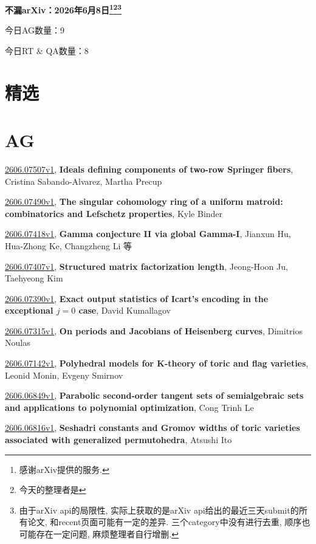 \documentclass[9pt, a4paper]{article}
\theoremstyle{plain}
\theoremstyle{definition}
\theoremstyle{remark}
\newcommand{\arxiv}[3]{\href{https://arxiv.org/abs/#1}{#1}, \textbf{\textcolor{arxivblue}{#2}}, #3}
\newcommand{\AGnumber}{9}
\newcommand{\RTQAnumber}{8}
\newcommand{\NewestDate}{2026年6月8日}
\newcommand{\todayarXiver}{} %
\begin{document}
\begin{center}
    \Huge\textbf{不漏arXiv：\NewestDate\footnote{感谢arXiv提供的服务.}\footnote{今天的整理者是\todayarXiver}\footnote{由于arXiv api的局限性, 实际上获取的是arXiv api给出的最近三天submit的所有论文, 和recent页面可能有一定的差异. 三个category中没有进行去重, 顺序也可能存在一定问题, 麻烦整理者自行增删.}} \\
\end{center}

\setcounter{section}{-1}

\begin{center}
    今日AG数量：\AGnumber
    
    今日RT \& QA数量：\RTQAnumber
    
\end{center}


\section{精选}


\section{AG}
\arxiv{2606.07507v1}{Ideals defining components of two-row Springer fibers}{Cristina Sabando-Alvarez, Martha Precup}

\arxiv{2606.07490v1}{The singular cohomology ring of a uniform matroid: combinatorics and Lefschetz properties}{Kyle Binder}

\arxiv{2606.07418v1}{Gamma conjecture II via global Gamma-I}{Jianxun Hu, Hua-Zhong Ke, Changzheng Li 等}

\arxiv{2606.07407v1}{Structured matrix factorization length}{Jeong-Hoon Ju, Taehyeong Kim}

\arxiv{2606.07390v1}{Exact output statistics of Icart's encoding in the exceptional \(j=0\) case}{David Kumallagov}

\arxiv{2606.07315v1}{On periods and Jacobians of Heisenberg curves}{Dimitrios Noulas}

\arxiv{2606.07142v1}{Polyhedral models for K-theory of toric and flag varieties}{Leonid Monin, Evgeny Smirnov}

\arxiv{2606.06849v1}{Parabolic second-order tangent sets of semialgebraic sets and applications to polynomial optimization}{Cong Trinh Le}

\arxiv{2606.06816v1}{Seshadri constants and Gromov widths of toric varieties associated with generalized permutohedra}{Atsushi Ito}
\end{document}

